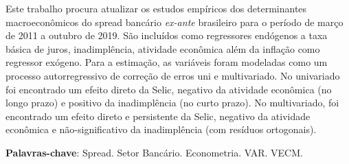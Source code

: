 \documentclass[a4paper,
               article,
               12pt,
               openany,
               oneside,
               english,
               brazil]{abntex2}
\numberwithin{equation}{section}
\begin{document}
\begin{resumo}
    Este trabalho procura atualizar os estudos empíricos dos determinantes macroeconômicos do spread bancário \textit{ex-ante} brasileiro para o período de março de 2011 a outubro de 2019. São incluídos como regressores endógenos a taxa básica de juros, inadimplência, atividade econômica além da inflação como regressor exógeno. Para a estimação, as variáveis foram modeladas como um processo autorregressivo de correção de erros uni e multivariado. No univariado foi encontrado um efeito direto da Selic, negativo da atividade econômica (no longo prazo) e positivo da inadimplência (no curto prazo). No multivariado, foi encontrado um efeito direto e persistente da Selic, negativo da atividade econômica e não-significativo da inadimplência (com resíduos ortogonais).
    \vspace{\onelineskip}
    \noindent

    \textbf{Palavras-chave}: Spread. Setor Bancário. Econometria. VAR\@. VECM\@.
\end{resumo}

\clearpage


\clearpage


\listoffigures
\clearpage
\listoftables
\clearpage

\tableofcontents*
\clearpage


\textual

\pagestyle{fancy}
\renewcommand{\headrulewidth}{0pt}
\end{document}
